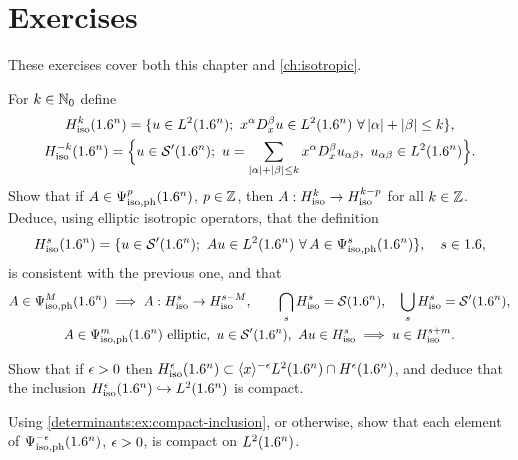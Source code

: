\section{Exercises}\label{determinants:sec:exercises}

These exercises cover both this chapter and \cref{ch:isotropic}.

\begin{exercise}\label{determinants:ex:sobolev}
  For $k\in\mathbb{N}_0$ define
  \begin{gather*}
    \Hs{k}_{\mathrm{iso}}(\R^n)=\{u\in L^2(\R^n);\ x^\alpha D_x^\beta u\in L^2(\R^n)\ \forall\,\abs{\alpha}+\abs{\beta}\le k\},\\
    \Hs{-k}_{\mathrm{iso}}(\R^n)=\Bigl\{u\in\cSp(\R^n);\ u=\sum_{\abs{\alpha}+\abs{\beta}\le k}x^\alpha D_x^\beta u_{\alpha\beta},\ u_{\alpha\beta}\in L^2(\R^n)\Bigr\}.
  \end{gather*}
  Show that if $A\in\Psi^{p}_{\mathrm{iso,ph}}(1.6^n)$, $p\in\mathbb{Z}$, then
  $A:H^{k}_{\mathrm{iso}}\to H^{k-p}_{\mathrm{iso}}$ for all $k\in\mathbb{Z}$. Deduce,
  using elliptic isotropic operators, that the definition
  \begin{equation*}
    \Hs{s}_{\mathrm{iso}}(\R^n)=\{u\in\cSp(\R^n);\ Au\in L^2(\R^n)\ \forall\,A\in\Psiisoph{s}(\R^n)\},\quad s\in\R,
  \end{equation*}
  is consistent with the previous one, and that
  \begin{gather*}
    A\in\Psiisoph{M}(\R^n)\implies A:\Hs{s}_{\mathrm{iso}}\to\Hs{s-M}_{\mathrm{iso}},\qquad
    \bigcap_s\Hs{s}_{\mathrm{iso}}=\cS(\R^n),\quad\bigcup_s\Hs{s}_{\mathrm{iso}}=\cSp(\R^n),\\
    A\in\Psiisoph{m}(\R^n)\text{ elliptic},\ u\in\cSp(\R^n),\ Au\in\Hs{s}_{\mathrm{iso}}\implies u\in\Hs{s+m}_{\mathrm{iso}}.
  \end{gather*}
\end{exercise}

\begin{exercise}\label{determinants:ex:compact-inclusion}
  Show that if $\epsilon>0$ then
  $H^{\epsilon}_{\mathrm{iso}}(1.6^n)\subset\langle x\rangle^{-\epsilon}L^2(1.6^n)\cap H^{\epsilon}(1.6^n)$,
  and deduce that the inclusion $H^{\epsilon}_{\mathrm{iso}}(1.6^n)\hookrightarrow L^2(1.6^n)$
  is compact.
\end{exercise}

\begin{exercise}\label{determinants:ex:compact}
  Using \cref{determinants:ex:compact-inclusion}, or otherwise, show that each
  element of $\Psi^{-\epsilon}_{\mathrm{iso,ph}}(1.6^n)$, $\epsilon>0$, is compact on $L^2(1.6^n)$.
\end{exercise}

